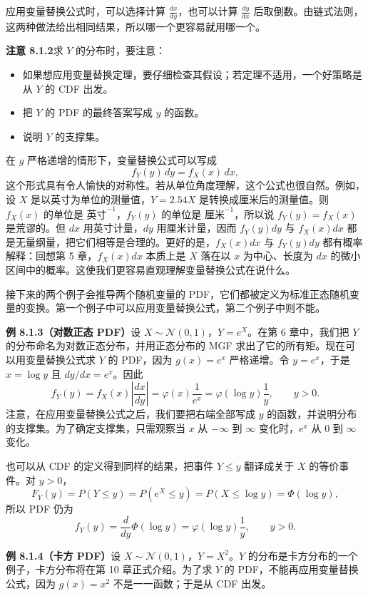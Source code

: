 \documentclass[UTF8,12pt,a4paper,fontset=fandol]{ctexart}
\begin{document}
应用变量替换公式时，可以选择计算 $\frac{dx}{dy}$，也可以计算 $\frac{dy}{dx}$ 后取倒数。由链式法则，这两种做法给出相同结果，所以哪一个更容易就用哪一个。

\noindent\textbf{注意 8.1.2}\quad 求 $Y$ 的分布时，要注意：
\begin{itemize}
  \item 如果想应用变量替换定理，要仔细检查其假设；若定理不适用，一个好策略是从 $Y$ 的 CDF 出发。
  \item 把 $Y$ 的 PDF 的最终答案写成 $y$ 的函数。
  \item 说明 $Y$ 的支撑集。
\end{itemize}

在 $g$ 严格递增的情形下，变量替换公式可以写成
\[
  f_Y(y)\,dy=f_X(x)\,dx,
\]
这个形式具有令人愉快的对称性。若从单位角度理解，这个公式也很自然。例如，设 $X$ 是以英寸为单位的测量值，$Y=2.54X$ 是转换成厘米后的测量值。则 $f_X(x)$ 的单位是 $\text{英寸}^{-1}$，$f_Y(y)$ 的单位是 $\text{厘米}^{-1}$，所以说 $f_Y(y)=f_X(x)$ 是荒谬的。但 $dx$ 用英寸计量，$dy$ 用厘米计量，因而 $f_Y(y)dy$ 与 $f_X(x)dx$ 都是无量纲量，把它们相等是合理的。更好的是，$f_X(x)dx$ 与 $f_Y(y)dy$ 都有概率解释：回想第 5 章，$f_X(x)dx$ 本质上是 $X$ 落在以 $x$ 为中心、长度为 $dx$ 的微小区间中的概率。这使我们更容易直观理解变量替换公式在说什么。

接下来的两个例子会推导两个随机变量的 PDF，它们都被定义为标准正态随机变量的变换。第一个例子中可以应用变量替换公式，第二个例子中则不能。

\noindent\textbf{例 8.1.3（对数正态 PDF）}\quad 设 $X\sim\mathcal N(0,1)$，$Y=e^X$。在第 6 章中，我们把 $Y$ 的分布命名为对数正态分布，并用正态分布的 MGF 求出了它的所有矩。现在可以用变量替换公式求 $Y$ 的 PDF，因为 $g(x)=e^x$ 严格递增。令 $y=e^x$，于是 $x=\log y$ 且 $dy/dx=e^x$。因此
\[
  f_Y(y)=f_X(x)\left|\frac{dx}{dy}\right|
  =\varphi(x)\frac{1}{e^x}
  =\varphi(\log y)\frac{1}{y},\qquad y>0.
\]
注意，在应用变量替换公式之后，我们要把右端全部写成 $y$ 的函数，并说明分布的支撑集。为了确定支撑集，只需观察当 $x$ 从 $-\infty$ 到 $\infty$ 变化时，$e^x$ 从 $0$ 到 $\infty$ 变化。

也可以从 CDF 的定义得到同样的结果，把事件 $Y\le y$ 翻译成关于 $X$ 的等价事件。对 $y>0$，
\[
  F_Y(y)=P(Y\le y)=P(e^X\le y)=P(X\le \log y)=\Phi(\log y),
\]
所以 PDF 仍为
\[
  f_Y(y)=\frac{d}{dy}\Phi(\log y)=\varphi(\log y)\frac{1}{y},\qquad y>0.
\]

\noindent\textbf{例 8.1.4（卡方 PDF）}\quad 设 $X\sim\mathcal N(0,1)$，$Y=X^2$。$Y$ 的分布是卡方分布的一个例子，卡方分布将在第 10 章正式介绍。为了求 $Y$ 的 PDF，不能再应用变量替换公式，因为 $g(x)=x^2$ 不是一一函数；于是从 CDF 出发。
\end{document}
